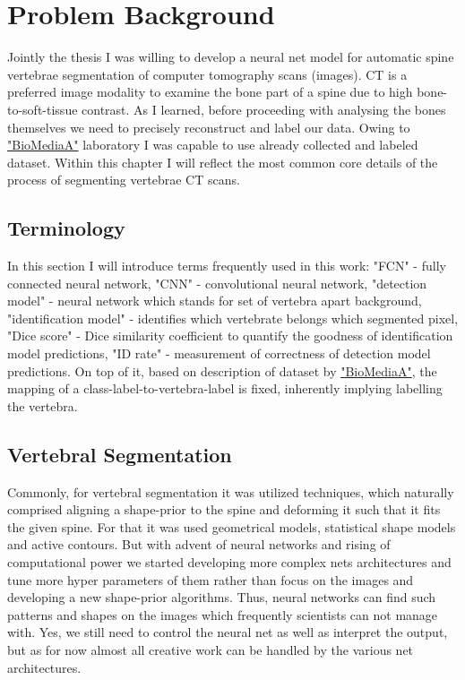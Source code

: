 \chapter{Problem Background}
\label{ch:problem_background}
Jointly the thesis I was willing to develop a neural net model for automatic spine vertebrae segmentation of computer tomography scans (images). CT is a preferred image modality to examine the bone part of a spine due to high bone-to-soft-tissue contrast. As I learned, before proceeding with analysing the bones themselves we need to precisely reconstruct and label our data. Owing to \href{https://biomedia.doc.ic.ac.uk/}{\color{blue}"BioMediaA"} laboratory I was capable to use already collected and labeled dataset. Within this chapter I will reflect the most common core details of the process of segmenting vertebrae CT scans.            

\section{Terminology}
In this section I will introduce terms frequently used in this work: "FCN" - fully connected neural network, "CNN" - convolutional neural network, "detection model" - neural network which stands for set of vertebra apart background, "identification model" - identifies which vertebrate belongs which segmented pixel, "Dice score" - Dice similarity coefficient to quantify the goodness of identification model predictions, "ID rate" - measurement of correctness of detection model predictions. On top of it, based on description of dataset by \href{https://biomedia.doc.ic.ac.uk/}{\color{blue}"BioMediaA"}, the mapping of a class-label-to-vertebra-label is fixed, inherently implying labelling the vertebra.    

\section{Vertebral Segmentation}
Commonly, for vertebral segmentation it was utilized techniques, which naturally comprised aligning a shape-prior to the spine and deforming it such that it fits the given spine. For that it was used geometrical models,  statistical shape models and active contours. But with advent of neural networks and rising of computational power we started developing more complex nets architectures and tune more hyper parameters of them rather than focus on the images and developing a new shape-prior algorithms. Thus, neural networks can find such patterns and shapes on the images which frequently scientists can not manage with. Yes, we still need to control the neural net as well as interpret the output, but as for now almost all creative work can be handled by the various net architectures.

